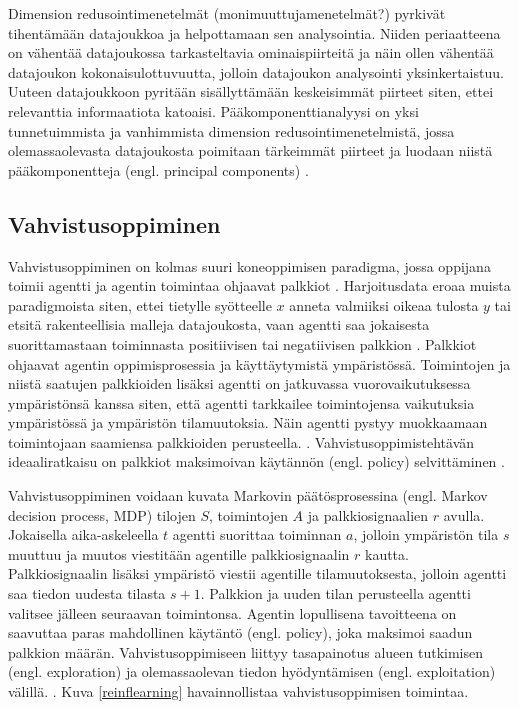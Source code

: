 \documentclass[utf8]{gradu3}
\begin{document}
Dimension redusointimenetelmät (monimuuttujamenetelmät?) pyrkivät tihentämään datajoukkoa ja helpottamaan sen analysointia. Niiden periaatteena on vähentää datajoukossa tarkasteltavia ominaispiirteitä ja näin ollen vähentää datajoukon kokonaisulottuvuutta, jolloin datajoukon analysointi yksinkertaistuu. Uuteen datajoukkoon pyritään sisällyttämään keskeisimmät piirteet siten, ettei relevanttia informaatiota katoaisi. Pääkomponenttianalyysi on yksi tunnetuimmista ja vanhimmista dimension redusointimenetelmistä, jossa olemassaolevasta datajoukosta poimitaan tärkeimmät piirteet ja luodaan niistä pääkomponentteja (engl. principal components) \parencite{abdi2010principal}.

\subsection{Vahvistusoppiminen}

Vahvistusoppiminen on kolmas suuri koneoppimisen paradigma, jossa oppijana toimii agentti ja agentin toimintaa ohjaavat palkkiot \parencite{jordan2015machine}. Harjoitusdata eroaa muista paradigmoista siten, ettei tietylle syötteelle \(x\) anneta valmiiksi oikeaa tulosta \(y\) tai etsitä rakenteellisia malleja datajoukosta, vaan agentti saa jokaisesta suorittamastaan toiminnasta positiivisen tai negatiivisen palkkion \parencite{jordan2015machine}. Palkkiot ohjaavat agentin oppimisprosessia ja käyttäytymistä ympäristössä. Toimintojen ja niistä saatujen palkkioiden lisäksi agentti on jatkuvassa vuorovaikutuksessa ympäristönsä kanssa siten, että agentti tarkkailee toimintojensa vaikutuksia ympäristössä ja ympäristön tilamuutoksia. Näin agentti pystyy muokkaamaan toimintojaan saamiensa palkkioiden perusteella. \parencite{arulkumaran2017brief}. Vahvistusoppimistehtävän ideaaliratkaisu on palkkiot maksimoivan käytännön (engl. policy) selvittäminen \parencite{arulkumaran2017brief}.

Vahvistusoppiminen voidaan kuvata Markovin päätösprosessina (engl. Markov decision process, MDP) tilojen \(S\), toimintojen \(A\) ja palkkiosignaalien \(r\) avulla. Jokaisella aika-askeleella \(t\) agentti suorittaa toiminnan \(a\), jolloin ympäristön tila \(s\) muuttuu ja muutos viestitään agentille palkkiosignaalin \(r\) kautta. Palkkiosignaalin lisäksi ympäristö viestii agentille tilamuutoksesta, jolloin agentti saa tiedon uudesta tilasta \(s + 1\). Palkkion ja uuden tilan perusteella agentti valitsee jälleen seuraavan toimintonsa. Agentin lopullisena tavoitteena on saavuttaa paras mahdollinen käytäntö (engl. policy), joka maksimoi saadun palkkion määrän. Vahvistusoppimiseen liittyy tasapainotus alueen tutkimisen (engl. exploration) ja olemassaolevan tiedon hyödyntämisen (engl. exploitation) välillä. \parencite{arulkumaran2017brief}. Kuva \ref{reinflearning} havainnollistaa vahvistusoppimisen toimintaa.
\end{document}

